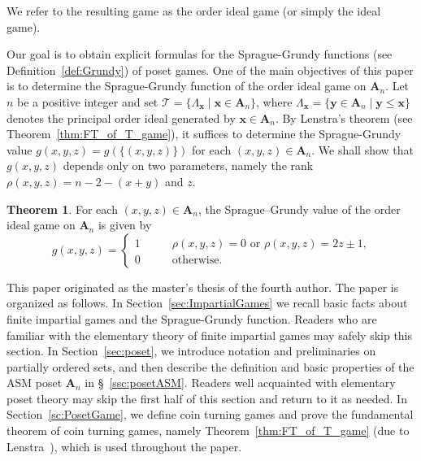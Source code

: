 \documentclass[a4paper,11pt]{amsart}
\theoremstyle{definition}
\newtheorem{thm}{Theorem}[section]
\numberwithin{equation}{section}
\def\T{\mathscr{T}}
\def\ASM#1{\boldsymbol{A}_{#1}}
\def\x{\boldsymbol{x}}
\def\y{\boldsymbol{y}}
\begin{document}
We refer to the resulting game as the order ideal game (or simply the ideal game).
%
\par\smallskip
%
Our goal is to obtain explicit formulas for the Sprague-Grundy functions \cite{WW,ONAG,Grundy,Sprague}
(see Definition~\ref{def:Grundy}) of poset games.
One of the main objectives of this paper is to determine the Sprague-Grundy function of the order ideal game on $\ASM{n}$.
Let $n$ be a positive integer and set $\T=\{\Lambda_{\x}\mid \x\in \ASM{n}\}$,
where $\Lambda_{\x}=\{\y\in\ASM{n}\mid \y\leq\x\}$ denotes the principal order ideal generated by $\x\in\ASM{n}$.
By Lenstra's theorem (see Theorem~\ref{thm:FT_of_T_game}), 
it suffices to determine the Sprague-Grundy value
$g(x, y, z)=g(\{(x, y, z)\})$ for each $(x, y, z) \in \ASM{n}$.
We shall show that $g(x, y, z)$ depends only on two parameters, 
namely the rank $\rho(x,y,z)=n-2-(x+y)$ and $z$.
%
\begin{thm}\label{th:ASM-ideal}
	For each 
	$(x, y, z) \in \ASM{n}$,
	the Sprague--Grundy value
	of the order ideal game on $\ASM{n}$
	is given by
	\begin{equation}\label{eq:ASM-ideal-grundy}
		g(x, y, z)
		=
		\begin{cases}
			1	&\qquad	\text{$\rho(x,y,z)=0$ or  $\rho(x,y,z)=2z \pm 1$,}\\
			0	&\qquad	\text{otherwise.}
		\end{cases}
	\end{equation}
\end{thm}
%
%
%
This paper originated as the master's thesis \cite{Ta} of the fourth author.
The paper is organized as follows.
In Section~\ref{sec:ImpartialGames} 
we recall basic facts about finite impartial games and the Sprague-Grundy function.
Readers who are familiar with the elementary theory of finite impartial games may safely skip this section.
In Section~\ref{sec:poset}, 
we introduce notation and preliminaries on partially ordered sets, 
and then describe the definition and basic properties of the ASM poset $\ASM{n}$ in \S~\ref{ssc:posetASM}.
Readers well acquainted with elementary poset theory may skip the first half of this section and return to it as needed.
In Section~\ref{sc:PosetGame},
we define coin turning games and prove the fundamental theorem of coin turning games, namely
Theorem~\ref{thm:FT_of_T_game} (due to Lenstra~\cite{Lenstra}), which is used throughout the paper.
\end{document}
